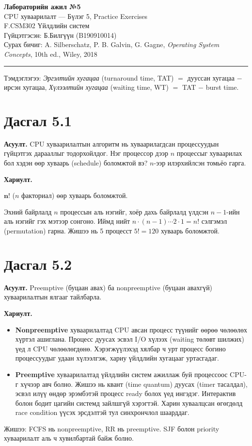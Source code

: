 \documentclass[12pt,a4paper]{article}
\newcommand{\question}[2]{\section{Дасгал #1}\textbf{Асуулт.} #2\par\medskip\textbf{Хариулт.}\par}
\begin{document}
\begin{center}
  {\Large\bfseries Лабораторийн ажил №5}\\[0.4em]
  {\large CPU хуваарилалт — Бүлэг 5, Practice Exercises}\\[0.8em]
  F.CSM302 Үйлдлийн систем\\
  Гүйцэтгэсэн: Б.Билгүүн (B190910014)\\[0.3em]
  Сурах бичиг: A. Silberschatz, P. B. Galvin, G. Gagne, \textit{Operating System Concepts}, 10th ed., Wiley, 2018
\end{center}
\hrule
\bigskip

Тэмдэглэгээ: \emph{Эргэлтийн хугацаа} (turnaround time, TAT) $=$ дууссан хугацаа $-$ ирсэн хугацаа, \emph{Хүлээлтийн хугацаа} (waiting time, WT) $=$ TAT $-$ burst time.

\question{5.1}{CPU хуваарилалтын алгоритм нь хуваарилагдсан процессуудын гүйцэтгэх дарааллыг тодорхойлдог. Нэг процессор дээр $n$ процессыг хуваарилах бол хэдэн өөр хуваарь (schedule) боломжтой вэ? $n$-ээр илэрхийлсэн томьёо гарга.}

$\mathbf{n!}$ ($n$ факториал) өөр хуваарь боломжтой.

Эхний байрлалд $n$ процессын аль нэгийг, хоёр дахь байрлалд үлдсэн $n-1$-ийн аль нэгийг гэх мэтээр сонгоно. Иймд нийт $n \cdot (n-1) \cdots 2 \cdot 1 = n!$ сэлгэмэл (permutation) гарна. Жишээ нь 5 процесст $5! = 120$ хуваарь боломжтой.

\question{5.2}{Preemptive (буцаан авах) ба nonpreemptive (буцаан авахгүй) хуваарилалтын ялгааг тайлбарла.}

\begin{itemize}[leftmargin=1.5em]
  \item \textbf{Nonpreemptive} хуваарилалтад CPU авсан процесс түүнийг өөрөө чөлөөлөх хүртэл ашиглана. Процесс дуусах эсвэл I/O хүлээх (waiting төлөвт шилжих) үед л CPU чөлөөлөгдөнө. Хэрэгжүүлэхэд хялбар ч урт процесс богино процессуудыг удаан хүлээлгэж, хариу үйлдлийн хугацааг уртасгадаг.
  \item \textbf{Preemptive} хуваарилалтад үйлдлийн систем ажиллаж буй процессоос CPU-г хүчээр авч болно. Жишээ нь квант (time quantum) дуусах (timer тасалдал), эсвэл илүү өндөр эрэмбэтэй процесс ready болох үед ингэдэг. Интерактив болон бодит цагийн системд зайлшгүй хэрэгтэй. Харин хуваалцсан өгөгдөлд race condition үүсэх эрсдэлтэй тул синхрончлол шаарддаг.
\end{itemize}
Жишээ: FCFS нь nonpreemptive, RR нь preemptive. SJF болон priority хуваарилалт аль ч хувилбартай байж болно.
\end{document}
